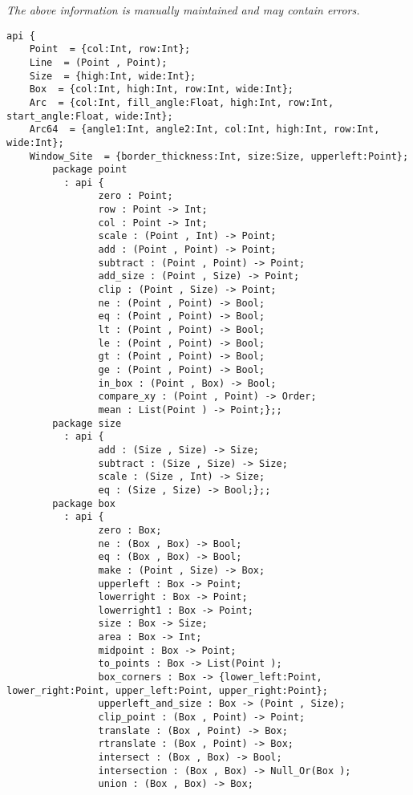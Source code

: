 \label{api:Geometry2d}

{\tiny \it The above information is manually maintained and may contain errors.}
\begin{verbatim}
api {
    Point  = {col:Int, row:Int};
    Line  = (Point , Point);
    Size  = {high:Int, wide:Int};
    Box  = {col:Int, high:Int, row:Int, wide:Int};
    Arc  = {col:Int, fill_angle:Float, high:Int, row:Int, start_angle:Float, wide:Int};
    Arc64  = {angle1:Int, angle2:Int, col:Int, high:Int, row:Int, wide:Int};
    Window_Site  = {border_thickness:Int, size:Size, upperleft:Point};
        package point
          : api {
                zero : Point;
                row : Point -> Int;
                col : Point -> Int;
                scale : (Point , Int) -> Point;
                add : (Point , Point) -> Point;
                subtract : (Point , Point) -> Point;
                add_size : (Point , Size) -> Point;
                clip : (Point , Size) -> Point;
                ne : (Point , Point) -> Bool;
                eq : (Point , Point) -> Bool;
                lt : (Point , Point) -> Bool;
                le : (Point , Point) -> Bool;
                gt : (Point , Point) -> Bool;
                ge : (Point , Point) -> Bool;
                in_box : (Point , Box) -> Bool;
                compare_xy : (Point , Point) -> Order;
                mean : List(Point ) -> Point;};;
        package size
          : api {
                add : (Size , Size) -> Size;
                subtract : (Size , Size) -> Size;
                scale : (Size , Int) -> Size;
                eq : (Size , Size) -> Bool;};;
        package box
          : api {
                zero : Box;
                ne : (Box , Box) -> Bool;
                eq : (Box , Box) -> Bool;
                make : (Point , Size) -> Box;
                upperleft : Box -> Point;
                lowerright : Box -> Point;
                lowerright1 : Box -> Point;
                size : Box -> Size;
                area : Box -> Int;
                midpoint : Box -> Point;
                to_points : Box -> List(Point );
                box_corners : Box -> {lower_left:Point, lower_right:Point, upper_left:Point, upper_right:Point};
                upperleft_and_size : Box -> (Point , Size);
                clip_point : (Box , Point) -> Point;
                translate : (Box , Point) -> Box;
                rtranslate : (Box , Point) -> Box;
                intersect : (Box , Box) -> Bool;
                intersection : (Box , Box) -> Null_Or(Box );
                union : (Box , Box) -> Box;

\end{verbatim}
